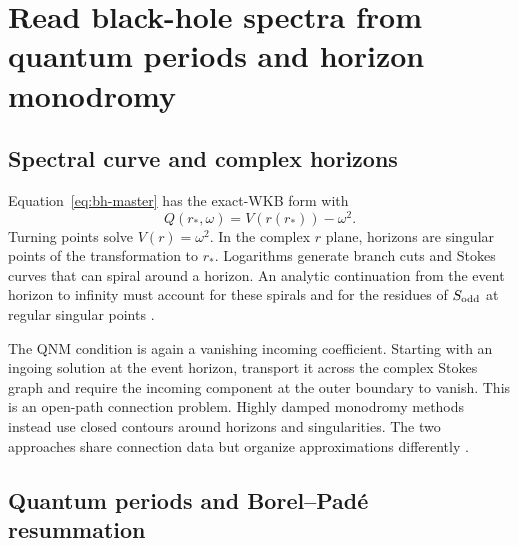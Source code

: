 \section{Read black-hole spectra from quantum periods and horizon monodromy}
\label{sec:bh-exact-wkb}

\subsection{Spectral curve and complex horizons}
\label{subsec:bh-spectral-curve}

Equation~\eqref{eq:bh-master} has the exact-WKB form with
\begin{equation}
  Q(r_*,\omega)=V(r(r_*))-\omega^2 .
  \label{eq:bh-Q}
\end{equation}
Turning points solve $V(r)=\omega^2$.  In the complex $r$ plane, horizons are
singular points of the transformation to $r_*$.  Logarithms generate branch
cuts and Stokes curves that can spiral around a horizon.  An analytic
continuation from the event horizon to infinity must account for these spirals
and for the residues of $S_{\mathrm{odd}}$ at regular singular points
\cite{Miyachi:2025ptm}.

The QNM condition is again a vanishing incoming coefficient.  Starting with
an ingoing solution at the event horizon, transport it across the complex
Stokes graph and require the incoming component at the outer boundary to
vanish.  This is an open-path connection problem.  Highly damped monodromy
methods instead use closed contours around horizons and singularities.  The
two approaches share connection data but organize approximations differently
\cite{Motl:2003cd}.

\subsection{Quantum periods and Borel--Pad\'e resummation}
\label{subsec:bh-quantum-periods}

